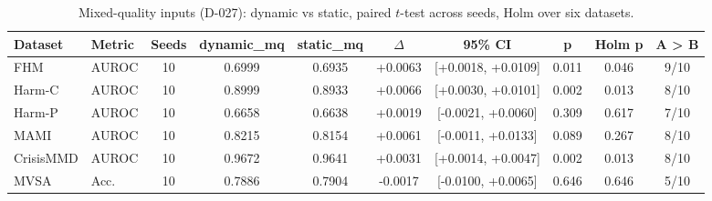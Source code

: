 \begin{table}[t]
\centering
\caption{Mixed-quality inputs (D-027): dynamic vs static, paired $t$-test across seeds, Holm over six datasets.}
\label{tab:mq-significance}
\begin{tabular}{llcccccccc}
\toprule
Dataset & Metric & Seeds & dynamic\_mq & static\_mq & $\Delta$ & 95\% CI & p & Holm p & A > B \\
\midrule
FHM & AUROC & 10 & 0.6999 & 0.6935 & +0.0063 & [+0.0018, +0.0109] & 0.011 & 0.046 & 9/10 \\
Harm-C & AUROC & 10 & 0.8999 & 0.8933 & +0.0066 & [+0.0030, +0.0101] & 0.002 & 0.013 & 8/10 \\
Harm-P & AUROC & 10 & 0.6658 & 0.6638 & +0.0019 & [-0.0021, +0.0060] & 0.309 & 0.617 & 7/10 \\
MAMI & AUROC & 10 & 0.8215 & 0.8154 & +0.0061 & [-0.0011, +0.0133] & 0.089 & 0.267 & 8/10 \\
CrisisMMD & AUROC & 10 & 0.9672 & 0.9641 & +0.0031 & [+0.0014, +0.0047] & 0.002 & 0.013 & 8/10 \\
MVSA & Acc. & 10 & 0.7886 & 0.7904 & -0.0017 & [-0.0100, +0.0065] & 0.646 & 0.646 & 5/10 \\
\bottomrule
\end{tabular}
\end{table}
